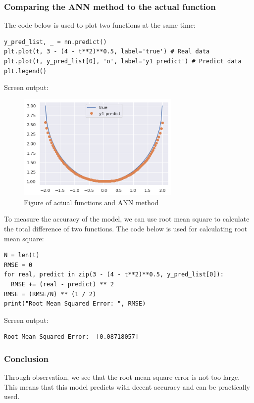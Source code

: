 \documentclass[a4paper]{article}
\numberwithin{equation}{section}
\begin{document}
\subsubsection{Comparing the ANN method to the actual function}
The code below is used to plot two functions at the same time:
\begin{mdframed}[leftline=false,rightline=false,backgroundcolor=magenta!10,nobreak=true]
  \begin{verbatim}
y_pred_list, _ = nn.predict()
plt.plot(t, 3 - (4 - t**2)**0.5, label='true') # Real data
plt.plot(t, y_pred_list[0], 'o', label='y1 predict') # Predict data
plt.legend()
    \end{verbatim}
\end{mdframed}
Screen output:
\begin{figure}[H]
  \centering
  \includegraphics[width=0.7\textwidth]{ODEplot.png}
  \caption{Figure of actual functions and ANN method}
\end{figure}

To measure the accuracy of the model, we can use root mean square to calculate the total difference of two functions. The code below is used for calculating root mean square:
\begin{mdframed}[leftline=false,rightline=false,backgroundcolor=magenta!10,nobreak=true]
  \begin{verbatim}
N = len(t)
RMSE = 0
for real, predict in zip(3 - (4 - t**2)**0.5, y_pred_list[0]):
  RMSE += (real - predict) ** 2
RMSE = (RMSE/N) ** (1 / 2)
print("Root Mean Squared Error: ", RMSE)
    \end{verbatim}
\end{mdframed}
Screen output:
\begin{mdframed}[leftline=false,rightline=false,backgroundcolor=Turquoise!10,nobreak=true]
  \begin{verbatim}
Root Mean Squared Error:  [0.08718057]
    \end{verbatim}
\end{mdframed}

\subsubsection{Conclusion}
Through observation, we see that the root mean square error is not too large. This means that this model predicts with decent accuracy and can be practically used.


\newpage

\printbibliography[heading=bibintoc]
\end{document}
